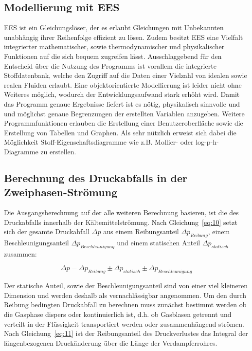 \subsection{Modellierung mit EES}
\label{subsec:Modellierung mit EES}

EES ist ein Gleichungslöser, der es erlaubt Gleichungen mit Unbekannten unabhängig ihrer Reihenfolge effizient zu lösen. Zudem besitzt EES eine Vielfalt integrierter mathematischer, sowie thermodynamischer und physikalischer Funktionen auf die sich bequem zugreifen lässt\cite{Klein.2000}. Ausschlaggebend für den Entscheid über die Nutzung des Programms ist vorallem die integrierte Stoffdatenbank, welche den Zugriff auf die Daten einer Vielzahl von idealen sowie realen Fluiden erlaubt. Eine objektorientierte Modellierung ist leider nicht ohne Weiteres möglich, wodurch der Entwicklungsaufwand stark erhöht wird. Damit das Programm genaue Ergebnisse liefert ist es nötig, physikalisch sinnvolle und und möglichst genaue Begrenzungen der erstellten Variablen anzugeben. 
Weitere Programmfunktionen erlauben die Erstellung einer Benutzeroberfläche sowie die Erstellung von Tabellen und Graphen. Als sehr nützlich erweist sich dabei die Möglichkeit Stoff-Eigenschaftsdiagramme wie z.B. Mollier- oder log-p-h-Diagramme zu erstellen.



\subsection{Berechnung des Druckabfalls in der Zweiphasen-Strömung}
\label{subsec:Berechnung des Druckabfalls in der Zweiphasen-Strömung}

Die Ausgangsberechnung auf der alle weiteren Berechnung basieren, ist die des Druckabfalls innerhalb der Kältemittelströmung.
Nach Gleichung~\ref{eq:10} setzt sich der gesamte Druckabfall $\Delta p$ aus einem Reibungsanteil $\Delta p_{Reibung}$, einem Beschleunigungsanteil $\Delta p_{Beschleunigung}$ und einem statischen Anteil $\Delta p_{statisch}$ zusammen\cite{SpringerVerlagGmbH.2013}:

\begin{equation}
\label{eq:10}
\Delta p =  \Delta p_{Reibung} \pm \Delta p_{statisch} \pm \Delta p_{Beschleunigung}
\end{equation}

Der statische Anteil, sowie der Beschleunigungsanteil sind von einer viel kleineren Dimension und werden deshalb als vernachlässigbar angenommen. Um den durch Reibung bedingten Druckabfall zu berechnen muss zunächst bestimmt werden ob die Gasphase dispers oder kontinuierlich ist, d.h. ob Gasblasen getrennt und verteilt in der Flüssigkeit transportiert werden oder zusammenhängend strömen. Nach Gleichung~\ref{eq:11} ist der Reibungsanteil des Druckverlustes das Integral der längenbezogenen Druckänderung über die Länge der Verdampferrohres.

